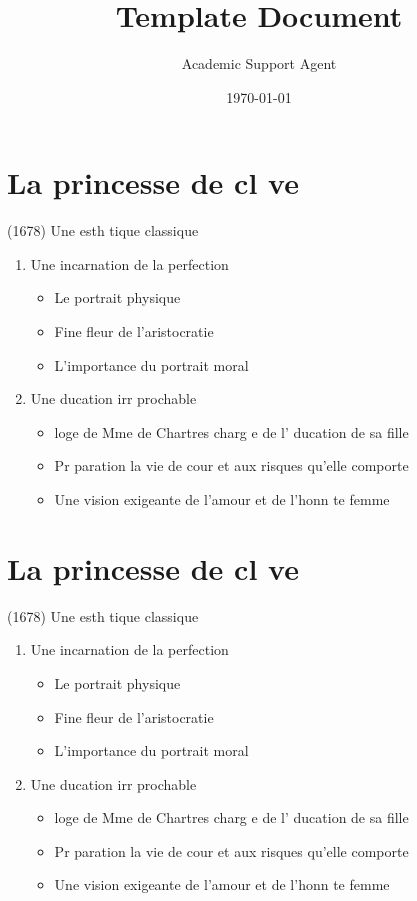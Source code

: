 \documentclass{article}
\title{Template Document}
\author{Academic Support Agent}
\date{\today}
\begin{document}
\maketitle

\section*{La princesse de cl ve}
	(1678) Une esth tique classique
\begin{enumerate}
   \item Une incarnation de la perfection
   \begin{itemize}
     \item Le portrait physique
     \item Fine fleur de l'aristocratie
     \item L'importance du portrait moral
   \end{itemize}
   \item Une  ducation irr prochable
   \begin{itemize}
       \item  loge de Mme de Chartres charg e de l' ducation de sa fille
       \item Pr paration   la vie de cour et aux risques qu'elle comporte
       \item Une vision exigeante de l'amour et de l'honn te femme
    \end{itemize}
\end{enumerate}
\noindent\hrulefill

\section*{La princesse de cl ve}
	(1678) Une esth tique classique
\begin{enumerate}
   \item Une incarnation de la perfection
   \begin{itemize}
     \item Le portrait physique
     \item Fine fleur de l'aristocratie
     \item L'importance du portrait moral
   \end{itemize}
   \item Une  ducation irr prochable
   \begin{itemize}
       \item  loge de Mme de Chartres charg e de l' ducation de sa fille
       \item Pr paration   la vie de cour et aux risques qu'elle comporte
       \item Une vision exigeante de l'amour et de l'honn te femme
    \end{itemize}
\end{enumerate}
\noindent\hrulefill
\end{document}
